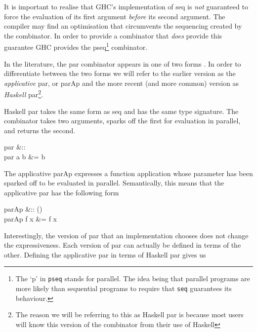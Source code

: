 It is important to realise that GHC's implementation of \<seq\> is
\emph{not} guaranteed to force the evaluation of its first argument
\emph{before} its second argument. The compiler may find an optimisation that
circumvents the sequencing created by the combinator. In order to provide a
combinator that \emph{does} provide this guarantee GHC provides the
\<pseq\>\footnote{The `p' in \texttt{pseq} stands for parallel.  The idea
being that parallel programs are more likely than sequential programs to
require that \texttt{seq} guarantees its behaviour.} combinator.

In the literature, the \<par\> combinator appears in one of two forms
\citep{HistoryOfHaskell, hughes:thesis}. In order to differentiate between the
two forms we will refer to the earlier version as the \emph{applicative} par, or
\<parAp\> and the more recent (and more common) version as \emph{Haskell}
\<par\>\footnote{The reason we will be referring to this as Haskell par is
because most users will know this version of the combinator from their use of
Haskell}.

Haskell \<par\> takes the same form as \<seq\> and has the same type
signature. The combinator takes two arguments, sparks off the first for
evaluation in parallel, and returns the second.

\begin{haskell}
par &:: \hasalpha \to \hasbeta \to \hasbeta \\
par a b &= b
\end{haskell}

The applicative \<parAp\> expresses a function application whose parameter has been
sparked off to be evaluated in parallel. Semantically, this means that the
applicative par has the following form

\begin{haskell}
parAp &:: (\hasalpha \to \hasbeta) \to \hasalpha \to \hasbeta \\
parAp f x &= f x
\end{haskell}


Interestingly, the version of \<par\> that an implementation chooses does
not change the expressiveness. Each version of \<par\> can actually be
defined in terms of the other. Defining the applicative par in terms of Haskell
par gives us

